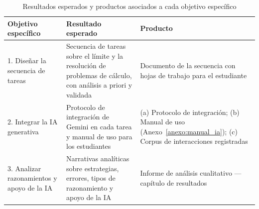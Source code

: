 \begin{table}[H]
\centering
\caption{Resultados esperados y productos asociados a cada objetivo específico}
\label{tab:resultados_esperados}
\small
\begin{tabular}{|p{4cm}|p{5cm}|p{4.5cm}|}
\hline
\textbf{Objetivo específico} & \textbf{Resultado esperado} & \textbf{Producto} \\
\hline
1. Diseñar la secuencia de tareas &
Secuencia de tareas sobre el límite y la resolución de problemas de cálculo, con análisis a priori y validada &
Documento de la secuencia con hojas de trabajo para el estudiante \\
\hline
2. Integrar la IA generativa &
Protocolo de integración de Gemini en cada tarea y manual de uso para los estudiantes &
(a) Protocolo de integración; (b) Manual de uso (Anexo~\ref{anexo:manual_ia}); (c) Corpus de interacciones registradas \\
\hline
3. Analizar razonamientos y apoyo de la IA &
Narrativas analíticas sobre estrategias, errores, tipos de razonamiento y apoyo de la IA &
Informe de análisis cualitativo --- capítulo de resultados \\
\hline
\end{tabular}
\end{table}






